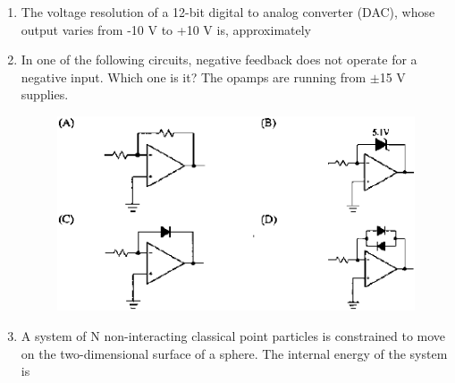 \documentclass[journal,12pt,onecolumn]{IEEEtran}
\theoremstyle{remark}
\begin{document}
\begin{enumerate}
\item The voltage resolution of a 12-bit digital to analog converter (DAC), whose output varies from -10 V to +10 V is, approximately\hfill{}

\begin{enumerate}  \end{enumerate}

\item In one of the following circuits, negative feedback does not operate for a negative input. Which one is it? The opamps are running from $\pm$15 V supplies.\hfill{}
\begin{figure}[H]
	\centering
	\caption*{} \label{fig:20} \includegraphics[width=0.9\columnwidth]{figs/20.png}
\end{figure}

\item A system of N non-interacting classical point particles is constrained to move on the two-dimensional surface of a sphere. The internal energy of the system is\hfill{}

\begin{enumerate}  \end{enumerate}


\end{enumerate}
\end{document}
